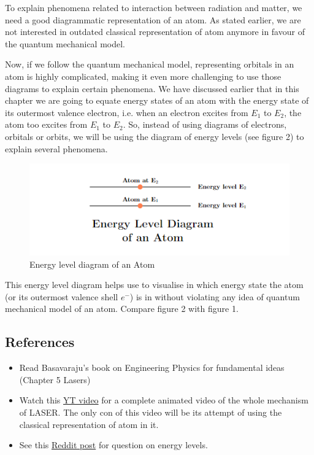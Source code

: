 \documentclass[12pt]{article}
\begin{document}
To explain phenomena related to interaction between radiation and matter, we need a good diagrammatic representation of an atom. As stated earlier, we are not interested in outdated classical representation of atom anymore in favour of the quantum mechanical model. \vspace{.2cm}

Now, if we follow the quantum mechanical model, representing orbitals in an atom is highly complicated, making it even more challenging to use those diagrams to explain certain phenomena. We have discussed earlier that in this chapter we are going to equate energy states of an atom with the energy state of its outermost valence electron, i.e. when an electron excites from $E_{1}$ to $E_{2}$, the atom too excites from $E_{1}$ to $E_{2}$. So, instead of using diagrams of electrons, orbitals or orbits, we will be using the diagram of energy levels (see figure 2) to explain several phenomena.

\begin{figure}[H]
    \centering
    \includegraphics[scale=0.8]{./img/02_energy_levels.png}
    \caption{Energy level diagram of an Atom}
\end{figure}

This energy level diagram helps use to visualise in which energy state the atom (or its outermost valence shell $e^{-}$) is in without violating any idea of quantum mechanical model of an atom. Compare figure 2 with figure 1.

\subsection{References}

\begin{itemize}
    \item Read Basavaraju's book on Engineering Physics for fundamental ideas (Chapter 5 Lasers)
    \item Watch this \href{https://www.youtube.com/watch?v=_JOchLyNO_w&t=233s}{YT video} for a complete animated video of the whole mechanism of LASER. The only con of this video will be its attempt of using the classical representation of atom in it.
    \item See this \href{https://www.reddit.com/r/Physics/comments/1ev7gss/are_energy_levels_for_electrons_or_atoms/}{Reddit post} for question on energy levels.
\end{itemize}
\end{document}
